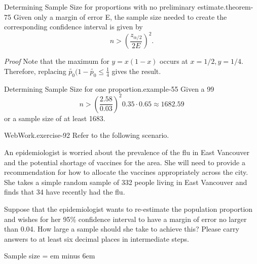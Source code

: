 \documentclass[10pt,]{book}
\makeatletter
\newcommand{\fillin}[1]{\leavevmode\leaders\vrule height -1.2pt depth 1.5pt \hskip #1em minus #1em \null}
\renewcommand*{\proofname}{Proof}
\renewenvironment{proof}[1][\proofname]{\par
  \pushQED{\qed}%
  \normalfont \topsep6\p@\@plus6\p@\relax
  \trivlist
  \item\relax
    {\itshape
    #1\@addpunct{.}}\hspace\labelsep\ignorespaces
}{%
  \popQED\endtrivlist\@endpefalse
}
\numberwithin{equation}{section}
\newcommand{\gt}{>}
\makeatother
\begin{document}
%
\par
\hypertarget{p-1373}{}%
\begin{theorem}{Determining Sample Size for proportions with no preliminary estimate.}{}{theorem-75}%
\hypertarget{p-1374}{}%
Given only a margin of error E, the sample size needed to create the corresponding confidence interval is given by%
\begin{equation*}
n \gt \left ( \frac{z_{\alpha /2}}{2 E} \right )^2 .
\end{equation*}
%
\end{theorem}
\begin{proof}\hypertarget{proof-75}{}
\hypertarget{p-1375}{}%
Note that the maximum for \(y = x(1-x) \) occurs at \(x = 1/2, y = 1/4.\) Therefore, replacing \(\tilde{p_0}(1-\tilde{p_0} \le \frac{1}{4}\) gives the result.%
\end{proof}
%
\begin{example}{Determining Sample Size for one proportion.}{example-55}%
\hypertarget{p-1376}{}%
Given a 99%
\begin{equation*}
n \gt \left ( \frac{2.58}{0.03} \right )^2 0.35 \cdot 0.65 \approx 1682.59
\end{equation*}
or a sample size of at least 1683.%
\end{example}
\hypertarget{p-1377}{}%
\begin{inlineexercise}{WebWork.}{exercise-92}%
\hypertarget{p-1378}{}%
Refer to the following scenario.%
\par
\hypertarget{p-1379}{}%
An epidemiologist is worried about the prevalence of the flu in East Vancouver and the potential shortage of vaccines for the area. She will need to provide a recommendation for how to allocate the vaccines appropriately across the city. She takes a simple random sample of 332 people living in East Vancouver and finds that 34 have recently had the flu.%
\par
\hypertarget{p-1380}{}%
Suppose that the epidemiologist wants to re-estimate the population proportion and wishes for her 95\% confidence interval to have a margin of error no larger than 0.04.  How large a sample should she take to achieve this? Please carry answers to at least six decimal places in intermediate steps.%
\par
\hypertarget{p-1381}{}%
Sample size =  \fillin{6}%
\end{inlineexercise}
%
%
%
\typeout{************************************************}
\typeout{************************************************}
%
\end{document}
